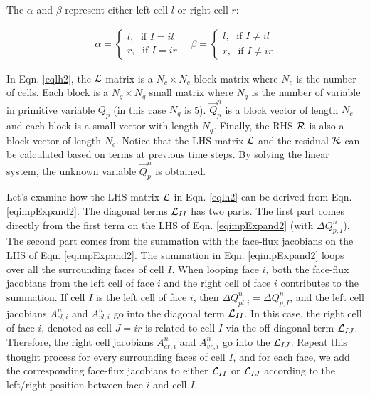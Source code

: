 \documentclass[12pt, letterpaper]{report}
\begin{document}
The $\alpha$ and $\beta$ represent either left cell $l$ or right cell $r$:

\begin{align*}
   \alpha = \begin{cases}
      l, \; \textrm{ if }I = il \\
      r, \; \textrm{ if }I = ir
      \end{cases} \quad \beta = \begin{cases}
      l, \; \textrm{ if } I \neq il \\
      r, \; \textrm{ if } I \neq ir
   \end{cases}
\end{align*}

In Eqn. \ref{eqlh2}, the $\mathcal{L}$ matrix is a $N_c \times N_c$ block matrix where $N_c$ is the number of
cells. Each block is a $N_q \times N_q$ small matrix where $N_q$ is the number of variable in
primitive variable $Q_p$ (in this case $N_q$ is 5). $\vec{Q}_p^n$ is a block vector of length $N_c$
and each block is a small vector with length $N_q$. Finally, the RHS $\mathcal{R}$ is also a block vector of
length $N_c$. Notice that the LHS matrix $\mathcal{L}$ and the residual $\mathcal{R}$ can be calculated based on terms
at previous time steps. By solving the linear system, the unknown variable $\vec{Q}_p^n$ is
obtained. \paraspace

Let's examine how the LHS matrix $\mathcal{L}$ in Eqn. \ref{eqlh2} can be derived from Eqn.
\ref{eqimpExpand2}. The diagonal terms $\mathcal{L}_{II}$ has two parts. The first part comes directly from
the first term on the LHS of Eqn. \ref{eqimpExpand2} (with $\Delta Q_{p,I}^n$). The second part
comes from the summation with the face-flux jacobians on the LHS of Eqn. \ref{eqimpExpand2}. The
summation in Eqn. \ref{eqimpExpand2} loops over all the surrounding faces of cell $I$. When looping
face $i$, both the face-flux jacobians from the left cell of face $i$ and the right cell of face $i$
contributes to the summation. If cell $I$ is the left cell of face $i$, then $\Delta Q_{pl,i}^n =
\Delta Q_{p,I}^n$, and the left cell jacobians $A_{cl,i}^n$ and $A_{vl,i}^n$ go into the diagonal
term $\mathcal{L}_{II}$. In this case, the right cell of face $i$, denoted as cell $J = ir$ is related to
cell $I$ via the off-diagonal term $\mathcal{L}_{IJ}$. Therefore, the right cell jacobians $A_{cr,i}^n$ and
$A_{vr,i}^n$ go into the $\mathcal{L}_{IJ}$. Repeat this thought process for every surrounding faces of cell
$I$, and for each face, we add the corresponding face-flux jacobians to either $\mathcal{L}_{II}$ or
$\mathcal{L}_{IJ}$ according to the left/right position between face $i$ and cell $I$.
\end{document}
